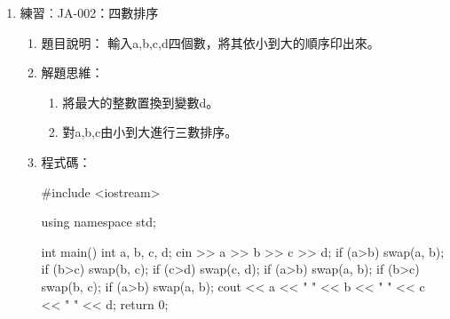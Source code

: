 \begin{enumerate}
\begin{enumerate}
			\item 解題思維：
			\begin{enumerate}
			\item 先宣告三整數 a, b, c並輸入其值。
			\begin{inside}
			int a, b, c;
			cin >> a >> b >> c;
			\end{inside}
			\item 三數排序時，先比a和b，如果a>b則交換兩個數，使a<b，之後再比b和c，使b<c，此時c為最大值。最後再比較和調整一次a和b即可。
			\begin{inside}
			if (a>b) swap(a, b);
			if (b>c) swap(b, c);
			if (a>b) swap(a, b);
			\end{inside}
			\item 交換兩數x和y，在\cc{}中可以直接使用swap函數，如果是在C裡面，則常用的方法是宣告另一個暫存變數t，然後使用以下敘述：
			\begin{inside}
			t=x; x=y; y=t;
			\end{inside}
			\end{enumerate} 
			
			\item 程式碼：
			\begin{cppcode}
				#include <iostream>
				using namespace std;
				
				int main()
				{
					int a, b, c;
					cin >> a >> b >> c;
					if (a>b) swap(a, b);
					if (b>c) swap(b, c);
					if (a>b) swap(a, b);
					cout << a << " " << b << " " << c;
					return 0;
				}
			\end{cppcode}
		\end{enumerate}
	\item 練習︰JA-002：四數排序
		\begin{enumerate}
			\item 題目說明：
			\subitem 輸入a,b,c,d四個數，將其依小到大的順序印出來。
			
			\item 解題思維：
			\begin{enumerate}
				\item 將最大的整數置換到變數d。
				\item 對a,b,c由小到大進行三數排序。
			\end{enumerate}
			
			\item 程式碼：
			\begin{cppcode}
				#include <iostream>
				
				using namespace std;
				
				int main()
				{
					int a, b, c, d;
					cin >> a >> b >> c >> d;
					if (a>b) swap(a, b);
					if (b>c) swap(b, c);
					if (c>d) swap(c, d);
					if (a>b) swap(a, b);
					if (b>c) swap(b, c);
					if (a>b) swap(a, b);
					cout << a << " " << b << " " << c << " " << d;
					return 0;
				}
				
			\end{cppcode}
		\end{enumerate}
	
\end{enumerate}
		
